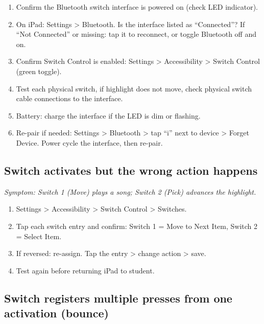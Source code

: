 \documentclass[justified,openright]{tufte-book}
\begin{document}
\begin{enumerate}
\item
  Confirm the Bluetooth switch interface is powered on (check LED
  indicator).
\item
  On iPad: Settings \textgreater{} Bluetooth. Is the interface listed as
  ``Connected''? If ``Not Connected'' or missing: tap it to reconnect,
  or toggle Bluetooth off and on.
\item
  Confirm Switch Control is enabled: Settings \textgreater{}
  Accessibility \textgreater{} Switch Control (green toggle).
\item
  Test each physical switch, if highlight does not move, check
  physical switch cable connections to the interface.
\item
  Battery: charge the interface if the LED is dim or flashing.
\item
  Re-pair if needed: Settings \textgreater{} Bluetooth \textgreater{}
  tap ``i'' next to device \textgreater{} Forget Device. Power cycle the
  interface, then re-pair.
\end{enumerate}

\subsection{Switch activates but the wrong action
happens}\label{switch-activates-but-the-wrong-action-happens}

\emph{Symptom: Switch 1 (Move) plays a song; Switch 2 (Pick) advances
the highlight.}

\begin{enumerate}
\item
  Settings \textgreater{} Accessibility \textgreater{} Switch Control
  \textgreater{} Switches.
\item
  Tap each switch entry and confirm: Switch 1 = Move to Next Item,
  Switch 2 = Select Item.
\item
  If reversed: re-assign. Tap the entry \textgreater{} change action
  \textgreater{} save.
\item
  Test again before returning iPad to student.
\end{enumerate}

\subsection{Switch registers multiple presses from one activation
(bounce)}\label{switch-registers-multiple-presses-from-one-activation-bounce}
\end{document}

